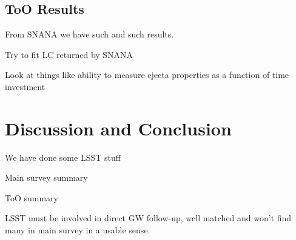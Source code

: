\subsection{ToO Results}
\label{sec:ch6_too_results}
From SNANA we have such and such results.

Try to fit LC returned by SNANA

Look at things like ability to measure ejecta properties as a function of time investment

\section{Discussion and Conclusion}
\label{sec:ch6_conc}
We have done some LSST stuff 

Main survey summary

ToO summary

LSST must be involved in direct GW follow-up, well matched and won't find many in main survey in a usable sense.

